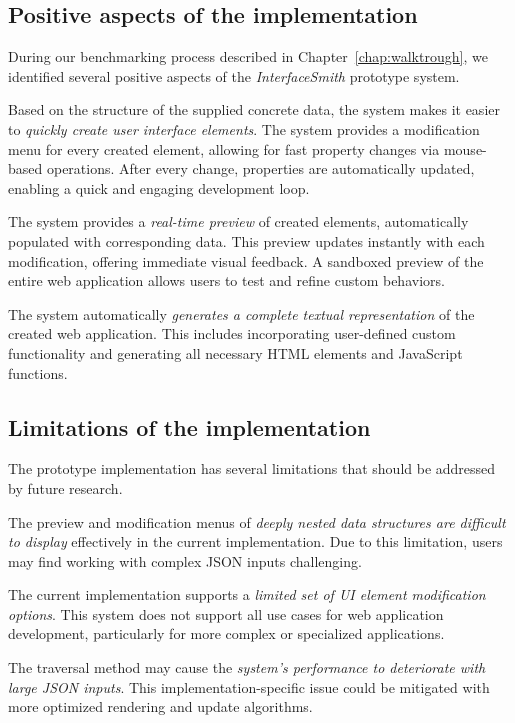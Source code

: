 \medskip
\subsection{Positive aspects of the implementation}
During our benchmarking process described in Chapter~\ref{chap:walktrough},
we identified several positive aspects of the \emph{InterfaceSmith} prototype system.

Based on the structure of the supplied concrete data, the system makes it easier to \emph{quickly create user interface elements}.
The system provides a modification menu for every created element, allowing for fast property changes via mouse-based operations.
After every change, properties are automatically updated, enabling a quick and engaging development loop.

The system provides a \emph{real-time preview} of created elements, automatically populated with corresponding data.
This preview updates instantly with each modification, offering immediate visual feedback.
A sandboxed preview of the entire web application allows users to test and refine custom behaviors.

The system automatically \emph{generates a complete textual representation} of the created web application.
This includes incorporating user-defined custom functionality and generating all necessary HTML elements and JavaScript functions.

\medskip
\subsection{Limitations of the implementation}
The prototype implementation has several limitations that should be addressed by future research.

The preview and modification menus of \emph{deeply nested data structures are difficult to display} effectively in the current implementation.
Due to this limitation, users may find working with complex JSON inputs challenging.

The current implementation supports a \emph{limited set of UI element modification options}.
This system does not support all use cases for web application development, particularly for more complex or specialized applications.

The traversal method may cause the \emph{system's performance to deteriorate with large JSON inputs}.
This implementation-specific issue could be mitigated with more optimized rendering and update algorithms.

